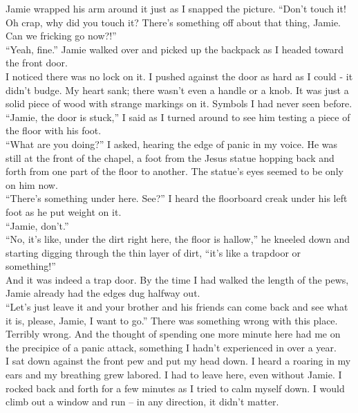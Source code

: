 \documentclass[a5paper]{scrartcl}
\begin{document}
Jamie wrapped his arm around it just as I snapped the picture.
\enquote{Don't touch it! Oh crap, why did you touch it? There's something off about that thing, Jamie. Can we fricking go now?!}\\

\enquote{Yeah, fine.} Jamie walked over and picked up the backpack as I headed toward the front door.\\


I noticed there was no lock on it. I pushed against the door as hard as I could - it didn't budge. My heart sank; there wasn't even a handle or a knob. It was just a solid piece of wood with strange markings on it. Symbols I had never seen before. \\


\enquote{Jamie, the door is stuck,} I said as I turned around to see him testing a piece of the floor with his foot.\\


\enquote{What are you doing?} I asked, hearing the edge of panic in my voice. He was still at the front of the chapel, a foot from the Jesus statue hopping back and forth from one part of the floor to another. The statue's eyes seemed to be only on him now.\\


\enquote{There's something under here. See?} I heard the floorboard creak under his left foot as he put weight on it. \\


\enquote{Jamie, don't.}\\


\enquote{No, it's like, under the dirt right here, the floor is hallow,} he kneeled down and starting digging through the thin layer of dirt, \enquote{it's like a trapdoor or something!}\\


And it was indeed a trap door. By the time I had walked the length of the pews, Jamie already had the edges dug halfway out.\\


\enquote{Let's just leave it and your brother and his friends can come back and see what it is, please, Jamie, I want to go.} There was something wrong with this place. Terribly wrong. And the thought of spending one more minute here had me on the precipice of a panic attack, something I hadn't experienced in over a year. \\


I sat down against the front pew and put my head down. I heard a roaring in my ears and my breathing grew labored. I had to leave here, even without Jamie. I rocked back and forth for a few minutes as I tried to calm myself down. I would climb out a window and run – in any direction, it didn't matter.\\
\end{document}
